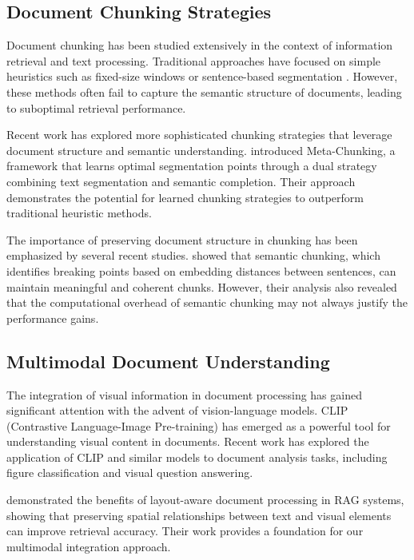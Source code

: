 \documentclass[11pt,a4paper]{article}
\begin{document}
\subsection{Document Chunking Strategies}

Document chunking has been studied extensively in the context of information retrieval and text processing. Traditional approaches have focused on simple heuristics such as fixed-size windows or sentence-based segmentation \citep{hearst1997texttiling}. However, these methods often fail to capture the semantic structure of documents, leading to suboptimal retrieval performance.

Recent work has explored more sophisticated chunking strategies that leverage document structure and semantic understanding. \citet{meta2024chunking} introduced Meta-Chunking, a framework that learns optimal segmentation points through a dual strategy combining text segmentation and semantic completion. Their approach demonstrates the potential for learned chunking strategies to outperform traditional heuristic methods.

The importance of preserving document structure in chunking has been emphasized by several recent studies. \citet{semantic2024chunking} showed that semantic chunking, which identifies breaking points based on embedding distances between sentences, can maintain meaningful and coherent chunks. However, their analysis also revealed that the computational overhead of semantic chunking may not always justify the performance gains.

\subsection{Multimodal Document Understanding}

The integration of visual information in document processing has gained significant attention with the advent of vision-language models. CLIP (Contrastive Language-Image Pre-training) \citep{radford2021learning} has emerged as a powerful tool for understanding visual content in documents. Recent work has explored the application of CLIP and similar models to document analysis tasks, including figure classification and visual question answering.

\citet{layout2024aware} demonstrated the benefits of layout-aware document processing in RAG systems, showing that preserving spatial relationships between text and visual elements can improve retrieval accuracy. Their work provides a foundation for our multimodal integration approach.
\end{document}
